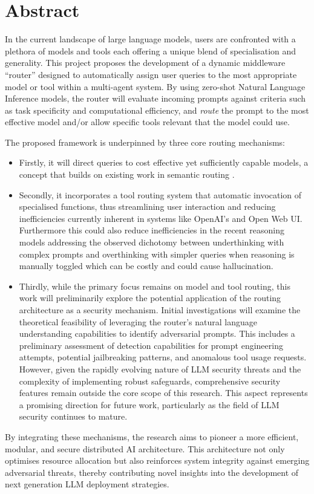 \chapter*{\center \Large  Abstract}

\noindent In the current landscape of large language models, users are confronted with a plethora of models and tools each offering a unique blend of specialisation and generality. This project proposes the development of a dynamic middleware ``router'' designed to automatically assign user queries to the most appropriate model or tool within a multi-agent system. By using zero-shot Natural Language Inference models, the router will evaluate incoming prompts against criteria such as task specificity and computational efficiency, and \textit{route} the prompt to the most effective model and/or allow specific tools relevant that the model could use.

The proposed framework is underpinned by three core routing mechanisms:

\begin{itemize}
    \item Firstly, it will direct queries to cost effective yet sufficiently capable models, a concept that builds on existing work in semantic routing \cite{ong2025routellmlearningroutellms}.
    
    \item Secondly, it incorporates a tool routing system that automatic invocation of specialised functions, thus streamlining user interaction and reducing inefficiencies currently inherent in systems like OpenAI's and Open Web UI. Furthermore this could also reduce inefficiencies in the recent reasoning models addressing the observed dichotomy between underthinking with complex prompts and overthinking with simpler queries when reasoning is manually toggled which can be costly and could cause hallucination.
    
    \item Thirdly, while the primary focus remains on model and tool routing, this work will preliminarily explore the potential application of the routing architecture as a security mechanism. Initial investigations will examine the theoretical feasibility of leveraging the router's natural language understanding capabilities to identify adversarial prompts. This includes a preliminary assessment of detection capabilities for prompt engineering attempts, potential jailbreaking patterns, and anomalous tool usage requests. However, given the rapidly evolving nature of LLM security threats and the complexity of implementing robust safeguards, comprehensive security features remain outside the core scope of this research. This aspect represents a promising direction for future work, particularly as the field of LLM security continues to mature.
\end{itemize}

\noindent By integrating these mechanisms, the research aims to pioneer a more efficient, modular, and secure distributed AI architecture. This architecture not only optimises resource allocation but also reinforces system integrity against emerging adversarial threats, thereby contributing novel insights into the development of next generation LLM deployment strategies.